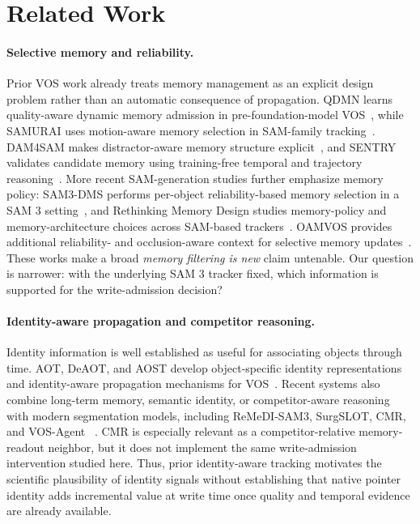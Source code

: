 \documentclass[10pt,twocolumn,letterpaper]{article}
\begin{document}
\section{Related Work}
\label{sec:related}

\paragraph{Selective memory and reliability.}
Prior VOS work already treats memory management as an explicit design
problem rather than an automatic consequence of propagation.
QDMN learns quality-aware dynamic memory admission in pre-foundation-model
VOS~\cite{QDMN}, while SAMURAI uses motion-aware memory selection in
SAM-family tracking~\cite{SAMURAI}.
DAM4SAM makes distractor-aware memory structure explicit~\cite{DAM4SAM},
and SENTRY validates candidate memory using training-free temporal and
trajectory reasoning~\cite{SENTRY}.
More recent SAM-generation studies further emphasize memory policy:
SAM3-DMS performs per-object reliability-based memory selection in a SAM 3
setting~\cite{SAM3-DMS}, and Rethinking Memory Design studies memory-policy
and memory-architecture choices across SAM-based trackers~\cite{RethinkingMemory}.
OAMVOS provides additional reliability- and occlusion-aware context for
selective memory updates~\cite{OAMVOS}.
These works make a broad \emph{memory filtering is new} claim untenable.
Our question is narrower: with the underlying SAM 3 tracker fixed, which
information is supported for the write-admission decision?

\paragraph{Identity-aware propagation and competitor reasoning.}
Identity information is well established as useful for associating objects
through time.
AOT, DeAOT, and AOST develop object-specific identity representations and
identity-aware propagation mechanisms for VOS~\cite{AOT,DeAOT,AOST}.
Recent systems also combine long-term memory, semantic identity, or
competitor-aware reasoning with modern segmentation models, including
ReMeDI-SAM3, SurgSLOT, CMR, and VOS-Agent
~\cite{ReMeDI-SAM3,SurgSLOT,CMR,VOS-Agent}.
CMR is especially relevant as a competitor-relative memory-readout neighbor,
but it does not implement the same write-admission intervention studied here.
Thus, prior identity-aware tracking motivates the scientific plausibility of
identity signals without establishing that native pointer identity adds
incremental value at write time once quality and temporal evidence are
already available.
\end{document}
